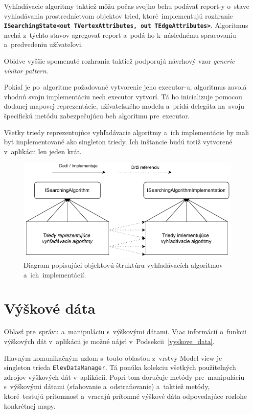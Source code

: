 Vyhľadávacie algoritmy taktiež môžu počas svojho behu podávať report-y o~stave vyhľadávania prostredníctvom objektov tried, ktoré~implementujú rozhranie \textbf{\texttt{ISearchingState<out TVertexAttributes, out TEdgeAttributes>}}. Algoritmus nechá z~týchto stavov agregovať report a~podá ho k~následnému spracovaniu a~predvedeniu užívateľovi.

Obidve vyššie spomenuté rozhrania taktiež podporujú návrhový vzor \textit{generic visitor pattern}. 

Pokiaľ je po~algoritme požadované vytvorenie jeho executor-u, algoritmus zavolá vhodnú svoju implementáciu nech executor vytvorí. Tá ho inicializuje pomocou dodanej mapovej reprezentácie, užívateľského modelu a~pridá delegáta na~svoju špecifickú metódu zabezpečujúcu beh algoritmu pre~executor.

Všetky triedy reprezentujúce vyhľadávacie algoritmy a~ich implementácie by mali byť implementované ako singleton triedy. Ich inštancie budú totiž vytvorené v~aplikácii len jeden krát.


\begin{figure}[h]\centering
\includegraphics[]{img/vyhladavacie_algoritmy_architektura}
\caption{Diagram popisujúci objektovú štruktúru vyhľadávacích algoritmov a~ich~implementácií.} 
\label{obr09:vyhladavacie_algoritmy_architektura}
\end{figure}

\pagebreak

\section{Výškové dáta}

Oblasť pre~správu a~manipuláciu s~výškovými dátami. Viac informácií o~funkcii výškových dát v~aplikácii je možné nájsť v~Podsekcii~\ref{vyskove_data}. 

Hlavným komunikačným uzlom s~touto oblasťou z~vrstvy Model view je singleton trieda \texttt{ElevDataManager}. Tá ponúka kolekciu všetkých použiteľných zdrojov výškových dát v~aplikácii. Popri tom doručuje metódy pre~manipuláciu s~výškovými dátami (sťahovanie a~odstraňovanie) a~taktiež metódy, ktoré~testujú prítomnosť a~vracajú prítomné výškové dáta odpovedajúce rozlohe konkrétnej mapy.

